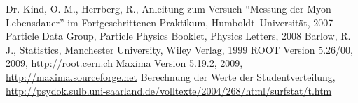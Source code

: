 \renewcommand{\refname}{Literatur und Programme}
\begin{thebibliography}{xxxxxx}
Dr. Kind, O. M., Herrberg, R., Anleitung zum Versuch ``Messung der
Myon-Lebensdauer'' im
Fortgeschrittenen-Praktikum, Humboldt–Universität, 2007
Particle Data Group, Particle Physics Booklet, Physics Letters, 2008
Barlow, R. J., Statistics, Manchester University, Wiley Verlag, 1999
ROOT Version 5.26/00, 2009, \href{http://root.cern.ch}{http://root.cern.ch}
Maxima Version 5.19.2, 2009, \href{http://maxima.sourceforge.net}{http://maxima.sourceforge.net}
Berechnung der Werte der Studentverteilung, \href{http://psydok.sulb.uni-saarland.de/volltexte/2004/268/html/surfstat/t.htm}{http://psydok.sulb.uni-saarland.de/volltexte/2004/268/html/surfstat/t.htm}
\end{thebibliography}